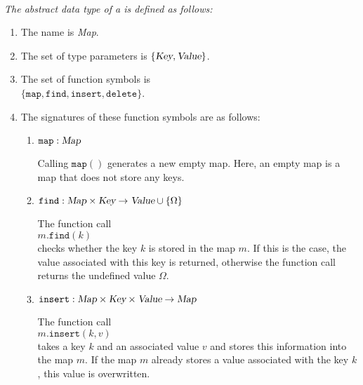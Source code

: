 \begin{Definition}[Map] \hspace*{\fill} \\
{\em
  The abstract data type of a  is defined as follows:
  \begin{enumerate}
  \item The name is \textsl{Map}.
  \item The set of type parameters is $\{ \textsl{Key}, \textsl{Value} \}$.
  \item The set of function symbols is \\[0.1cm]
       \hspace*{1.3cm} 
       $\{ \texttt{map}, \texttt{find}, \texttt{insert}, \texttt{delete} \}$.
  \item The signatures of these function symbols are as follows:
        \begin{enumerate}
        \item $\texttt{map}: \textsl{Map}$

              Calling $\texttt{map}()$ generates a new empty map.  Here, an empty map is a map that
              does not store any keys.
        \item $\texttt{find}: \textsl{Map} \times \textsl{Key} \rightarrow \textsl{Value} \cup \{\Omega\}$

              The function call
              \\[0.2cm]
              \hspace*{1.3cm}
              $m.\texttt{find}(k)$ 
              \\[0.2cm]
              checks whether the key $k$ is stored in the map $m$.  If this is the case, the
              value associated with this key is returned, otherwise the function call returns
              the undefined value $\Omega$.
        \item $\texttt{insert}: \textsl{Map} \times \textsl{Key} \times \textsl{Value} \rightarrow \textsl{Map}$

              The function call
              \\[0.2cm]
              \hspace*{1.3cm}
              $m.\texttt{insert}(k,v)$ 
              \\[0.2cm]
              takes a key $k$ and an associated value $v$ and stores this information into the map
              $m$.  If the map $m$ already stores a value associated with the key $k$, this value
              is overwritten.  


\end{enumerate}
\end{enumerate}}
\end{Definition}

